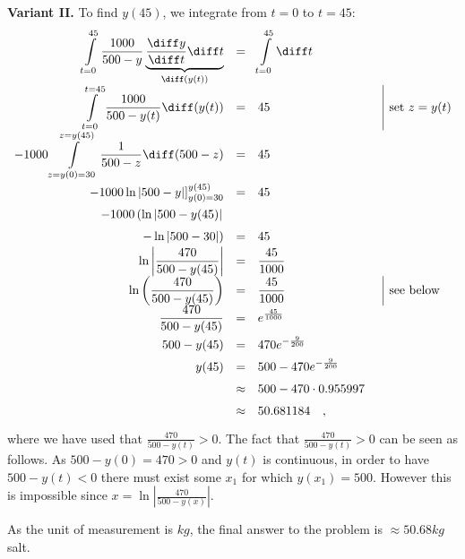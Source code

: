 {\textbf{Variant II.} 
To find $y(45)$, we integrate from $t=0$ to $t=45$:
\[
{\renewcommand{\arraystretch}{1.5}
\begin{array}{rcll|l}
\displaystyle \int\limits_{t=0}^{45} \frac{1000}{500- y} \underbrace{ \frac{\diff y}{\diff t} \diff t}_{\diff (y(t))} &=& \displaystyle \int\limits_{t=0}^{45} \diff t \\
\displaystyle \int\limits_{t=0}^{t=45} \frac{1000}{500-y(t)}\diff (y(t))&=& 45&&\text{set }z=y(t) \\
\displaystyle -1000 \int \limits_{z=y(0)=30}^{z=y(45)} \frac{1}{500-z}\diff(500-z)&=& 45 \\
\displaystyle \left. -1000 \ln |500-y| \right]_{y(0)=30}^{y(45)}&=& 45 \\
\displaystyle -1000 \left( \ln |500-y(45)|\right. \\
\left. -\ln |500- 30|  \right) &=& 45 \\
\displaystyle \ln \left| \frac{470}{500-y(45)} \right|  &=& \displaystyle \frac{45}{1000}
\\
\displaystyle \ln \left( \frac{470}{500-y(45)} \right)  &=& \displaystyle \frac{45}{1000} &&\text{see below}
\\
\displaystyle \frac{470}{500-y(45)}&=&\displaystyle e^{\frac{45}{1000}}\\
\displaystyle 500-y(45)&=&\displaystyle  470e^{-\frac{9}{200}}\\
\displaystyle y(45)&=&\displaystyle 500-470e^{-\frac{9}{200}}\\
&\approx& 500-470\cdot 0.955997 \\
&\approx& 50.681184 \quad ,
\end{array}
}
\]
where we have used that $\displaystyle \frac{470}{500-y(t)}>0 $. The fact that $\displaystyle \frac{470}{500-y(t)}>0 $ can be seen as follows. As $500-y(0)=470>0$ and $y(t)$ is continuous, in order to have $500-y(t)<0$ there must exist some $x_1$ for which $y(x_1)=500$. However this is impossible since $\displaystyle x=\ln \left|\frac{470}{500-y(x)}\right|  $. 

As the unit of measurement is $kg$, the final answer to the problem is $\approx 50.68 kg$ salt.
}